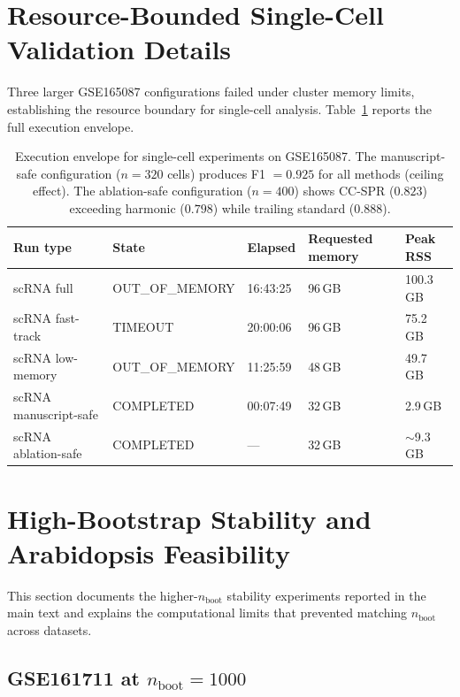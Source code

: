 \documentclass[11pt]{article}
\begin{document}
\section{Resource-Bounded Single-Cell Validation Details}
\label{sec:supp_scrna}

Three larger GSE165087 configurations failed under cluster memory limits, establishing the resource boundary for single-cell analysis.
Table~\ref{tab:supp_scrna} reports the full execution envelope.

\begin{table}[h]
\centering
\small
\begin{tabular}{lllll}
\toprule
Run type & State & Elapsed & Requested memory & Peak RSS \\
\midrule
scRNA full & OUT\_OF\_MEMORY & 16:43:25 & 96\,GB & 100.3\,GB \\
scRNA fast-track & TIMEOUT & 20:00:06 & 96\,GB & 75.2\,GB \\
scRNA low-memory & OUT\_OF\_MEMORY & 11:25:59 & 48\,GB & 49.7\,GB \\
scRNA manuscript-safe & COMPLETED & 00:07:49 & 32\,GB & 2.9\,GB \\
scRNA ablation-safe & COMPLETED & --- & 32\,GB & ${\sim}$9.3\,GB \\
\bottomrule
\end{tabular}
\caption{Execution envelope for single-cell experiments on GSE165087.
The manuscript-safe configuration ($n=320$ cells) produces F1 $= 0.925$ for all methods (ceiling effect).
The ablation-safe configuration ($n=400$) shows CC-SPR ($0.823$) exceeding harmonic ($0.798$) while trailing standard ($0.888$).}
\label{tab:supp_scrna}
\end{table}


\section{High-Bootstrap Stability and Arabidopsis Feasibility}
\label{sec:supp_feasibility}

This section documents the higher-$n_{\text{boot}}$ stability experiments reported in the main text and explains the computational limits that prevented matching $n_{\text{boot}}$ across datasets.

\subsection{GSE161711 at $n_{\text{boot}} = 1000$}
\end{document}
